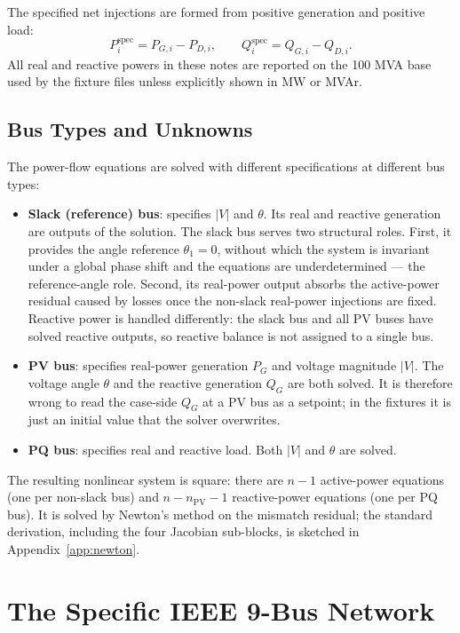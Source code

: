 \documentclass[11pt]{article}
\begin{document}
The specified net injections are formed from positive generation and
positive load:
\[
  P_i^{\mathrm{spec}} = P_{G,i} - P_{D,i}, \qquad
  Q_i^{\mathrm{spec}} = Q_{G,i} - Q_{D,i}.
\]
All real and reactive powers in these notes are reported on the 100 MVA
base used by the fixture files unless explicitly shown in MW or MVAr.

\subsection{Bus Types and Unknowns}

The power-flow equations are solved with different specifications at
different bus types:
\begin{itemize}
  \item \textbf{Slack (reference) bus}: specifies $|V|$ and $\theta$. Its
  real and reactive generation are outputs of the solution. The slack
  bus serves two structural roles. First, it provides the angle
  reference $\theta_1 = 0$, without which the system is invariant under a
  global phase shift and the equations are underdetermined --- the
  reference-angle role. Second, its real-power output absorbs the
  active-power residual caused by losses once the non-slack real-power
  injections are fixed. Reactive power is handled differently: the slack
  bus and all PV buses have solved reactive outputs, so reactive balance
  is not assigned to a single bus.
  \item \textbf{PV bus}: specifies real-power generation $P_G$ and voltage
  magnitude $|V|$. The voltage angle $\theta$ and the reactive generation
  $Q_G$ are both solved. It is therefore wrong to read the case-side
  $Q_G$ at a PV bus as a setpoint; in the fixtures it is just an initial
  value that the solver overwrites.
  \item \textbf{PQ bus}: specifies real and reactive load. Both $|V|$ and
  $\theta$ are solved.
\end{itemize}

The resulting nonlinear system is square: there are $n - 1$ active-power
equations (one per non-slack bus) and $n - n_{\mathrm{PV}} - 1$
reactive-power equations (one per PQ bus). It is solved by Newton's
method on the mismatch residual; the standard derivation, including the
four Jacobian sub-blocks, is sketched in Appendix~\ref{app:newton}.

\section{The Specific IEEE 9-Bus Network}
\end{document}
